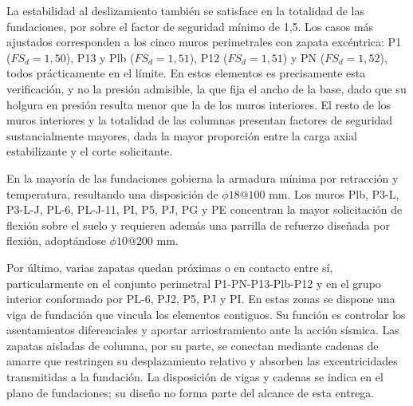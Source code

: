 La estabilidad al deslizamiento también se satisface en la totalidad de las fundaciones, por sobre
el factor de seguridad mínimo de 1,5. Los casos más ajustados corresponden a los cinco muros
perimetrales con zapata excéntrica: P1 ($FS_d = 1,50$), P13 y Plb ($FS_d = 1,51$), P12
($FS_d = 1,51$) y PN ($FS_d = 1,52$), todos prácticamente en el límite. En estos elementos es
precisamente esta verificación, y no la presión admisible, la que fija el ancho de la base, dado
que su holgura en presión resulta menor que la de los muros interiores. El resto de los muros
interiores y la totalidad de las columnas presentan factores de seguridad sustancialmente mayores,
dada la mayor proporción entre la carga axial estabilizante y el corte solicitante.

En la mayoría de las fundaciones gobierna la armadura mínima por retracción y temperatura,
resultando una disposición de $\phi 18@100$ mm. Los muros Plb, P3-L, P3-L-J, PL-6, PL-J-11, PI,
P5, PJ, PG y PE concentran la mayor solicitación de flexión sobre el suelo y requieren además una
parrilla de refuerzo diseñada por flexión, adoptándose $\phi 10@200$ mm.

Por último, varias zapatas quedan próximas o en contacto entre sí, particularmente en el conjunto
perimetral P1-PN-P13-Plb-P12 y en el grupo interior conformado por PL-6, PJ2, P5, PJ y PI. En
estas zonas se dispone una viga de fundación que vincula los elementos contiguos. Su función es
controlar los asentamientos diferenciales y aportar arriostramiento ante la acción sísmica. Las
zapatas aisladas de columna, por su parte, se conectan mediante cadenas de amarre que restringen
su desplazamiento relativo y absorben las excentricidades transmitidas a la fundación. La
disposición de vigas y cadenas se indica en el plano de fundaciones; su diseño no forma parte del
alcance de esta entrega.